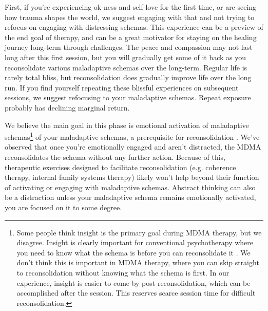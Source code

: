\documentclass[12pt,letterpaper]{book}
\begin{document}
First, if you're experiencing ok-ness and self-love for the first time, or are seeing how trauma shapes the world, we suggest engaging with that and not trying to refocus on engaging with distressing schemas. This experience can be a preview of the end goal of therapy, and can be a great motivator for staying on the healing journey long-term through challenges. The peace and compassion may not last long after this first session, but you will gradually get some of it back as you reconsolidate various maladaptive schemas over the long-term. Regular life is rarely total bliss, but reconsolidation does gradually improve life over the long run. If you find yourself repeating these blissful experiences on subsequent sessions, we suggest refocusing to your maladaptive schemas. Repeat exposure probably has declining marginal return.

We believe the main goal in this phase is emotional activation of maladaptive schemas\footnote{Some people think insight is the primary goal during MDMA therapy, but we disagree. Insight is clearly important for conventional psychotherapy where you need to know what the schema is before you can reconsolidate it \cite{eckerUnlocking}. We don't think this is important in MDMA therapy, where you can skip straight to reconsolidation without knowing what the schema is first. In our experience, insight is easier to come by post-reconsolidation, which can be accomplished after the session. This reserves scarce session time for difficult reconsolidation.} of your maladaptive schemas, a prerequisite for reconsolidation \cite{eckerUnlocking}. We've observed that once you're emotionally engaged and aren't distracted, the MDMA reconsolidates the schema without any further action. Because of this, therapeutic exercises designed to facilitate reconsolidation (e.g. coherence therapy, internal family systems therapy) likely won't help beyond their function of activating or engaging with maladaptive schemas. Abstract thinking can also be a distraction unless your maladaptive schema remains emotionally activated, you are focused on it to some degree.
\end{document}
